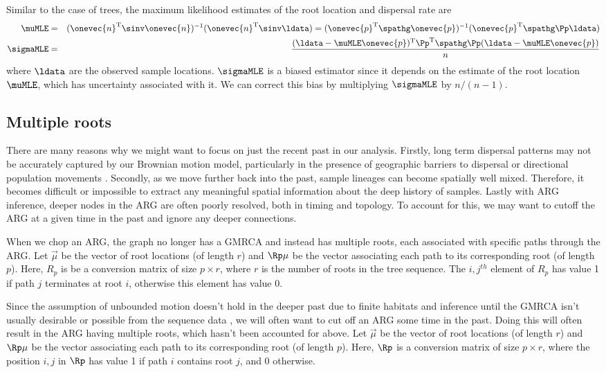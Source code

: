 Similar to the case of trees, the maximum likelihood estimates of the root location and dispersal rate are
\begin{eqnarray}
    \muMLE &=& (\onevec{n}^\text{T} \sinv \onevec{n})^{-1}(\onevec{n}^\text{T} \sinv \ldata) = (\onevec{p}^\text{T} \spathg \onevec{p})^{-1}(\onevec{p}^\text{T}\spathg\Pp \ldata) \\
    \sigmaMLE &=& \displaystyle \frac{ (\ldata - \muMLE\onevec{p})^\text{T} \Pp^\text{T}\spathg\Pp (\ldata - \muMLE\onevec{p}) }{n}
\end{eqnarray}
where $\ldata$ are the observed sample locations. $\sigmaMLE$ is a biased estimator since it depends on the estimate of the root location $\muMLE$, which has uncertainty associated with it. We can correct this bias by multiplying $\sigmaMLE$ by $n/(n-1)$.


\subsection{Multiple roots}


There are many reasons why we might want to focus on just the recent past in our analysis. Firstly, long term dispersal patterns may not be accurately captured by our Brownian motion model, particularly in the presence of geographic barriers to dispersal or directional population movements \citep{Ianni2022, WakeleySCATTERINGETC}. Secondly, as we move further back into the past, sample lineages can become spatially well mixed. Therefore, it becomes difficult or impossible to extract any meaningful spatial information about the deep history of samples. Lastly with ARG inference, deeper nodes in the ARG are often poorly resolved, both in timing and topology. To account for this, we may want to cutoff the ARG at a given time in the past and ignore any deeper connections.

When we chop an ARG, the graph no longer has a GMRCA and instead has multiple roots, each associated with specific paths through the ARG. Let $\vec{\mu}$ be the vector of root locations (of length $r$) and $\Rp \mu$ be the vector associating each path to its corresponding root (of length $p$). Here, $R_p$ is be a conversion matrix of size $p \times r$, where $r$ is the number of roots in the tree sequence. The $i,j^{th}$ element of $R_p$ has value 1 if path $j$ terminates at root $i$, otherwise this element has value 0.


Since the assumption of unbounded motion doesn't hold in the deeper past due to finite habitats \citep{Ianni2022, WakeleySCATTERINGETC} and inference until the GMRCA isn't usually desirable or possible from the sequence data \cite{}, we will often want to cut off an ARG some time in the past. 
Doing this will often result in the ARG having multiple roots, which hasn't been accounted for above. Let $\vec{\mu}$ be the vector of root locations (of length $r$) and $\Rp \mu$ be the vector associating each path to its corresponding root (of length $p$). Here, $\Rp$ is a conversion matrix of size $p \times r$, where the position $i,j$ in $\Rp$ has value 1 if path $i$ contains root $j$, and 0 otherwise. 

